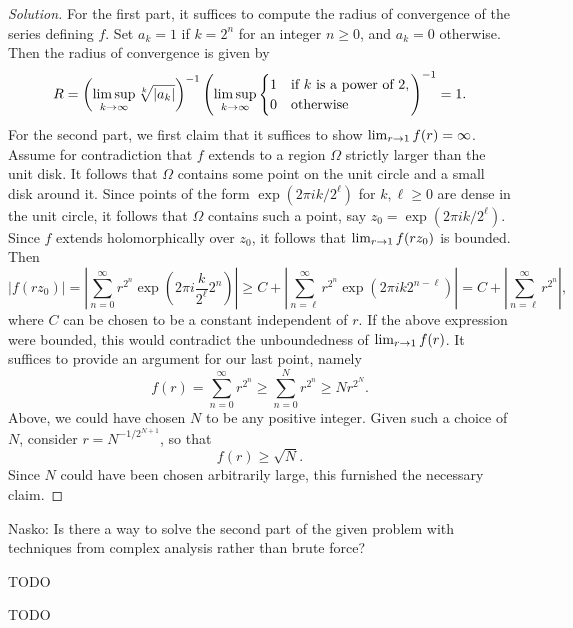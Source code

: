 \begin{proof}[Solution]
  For the first part, it suffices to compute the radius of convergence of the series defining $f$. Set $a_k = 1$ if $k = 2^n$ for an integer $n \geq 0$, and $a_k = 0$ otherwise. Then the radius of convergence is given by
  \[
  R =
  \left( \limsup_{k \rightarrow \infty} \sqrt[k]{|a_k|} \right)^{-1}
  \left( \limsup_{k \rightarrow \infty}
    \begin{cases}
      1 & \textnormal{if $k$ is a power of $2$}, \\
      0 & \textnormal{otherwise}
    \end{cases}
  \right)^{-1} =
  1.
  \]
  For the second part, we first claim that it suffices to show $\lim_{r \rightarrow 1} f(r) = \infty$. Assume for contradiction that $f$ extends to a region $\Omega$ strictly larger than the unit disk. It follows that $\Omega$ contains some point on the unit circle and a small disk around it. Since points of the form $\exp(2\pi i k/2^\ell)$ for $k,\ell \geq 0$ are dense in the unit circle, it follows that $\Omega$ contains such a point, say $z_0 = \exp(2 \pi i k/2^\ell)$. Since $f$ extends holomorphically over $z_0$, it follows that $\lim_{r \rightarrow 1} f(r z_0)$ is bounded. Then
  \[
  |f(r z_0)| =
  \left| \sum_{n=0}^\infty r^{2^n} \exp\left( 2 \pi i \frac{k}{2^\ell} 2^n \right) \right| \geq
  C + \left| \sum_{n=\ell}^\infty r^{2^n} \exp\left( 2 \pi i k 2^{n-\ell} \right) \right| =
  C + \left| \sum_{n=\ell}^\infty r^{2^n} \right|,
  \]
  where $C$ can be chosen to be a constant independent of $r$. If the above expression were bounded, this would contradict the unboundedness of $\lim_{r \rightarrow 1} f(r)$. It suffices to provide an argument for our last point, namely
  \[
  f(r) =
  \sum_{n=0}^\infty r^{2^n} \geq
  \sum_{n=0}^N r^{2^n} \geq
  N r^{2^N}.
  \]
  Above, we could have chosen $N$ to be any positive integer. Given such a choice of $N$, consider $r = N^{-1/2^{N+1}}$, so that
  \[
  f(r) \geq \sqrt{N}.
  \]
  Since $N$ could have been chosen arbitrarily large, this furnished the necessary claim.
\end{proof}

Nasko: Is there a way to solve the second part of the given problem with techniques from complex analysis rather than brute force?


TODO


TODO


